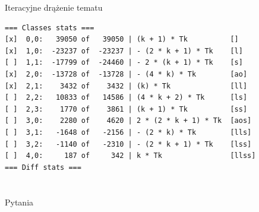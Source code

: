 \documentclass[final]{beamer}
\theoremstyle{bluetheorem}
\theoremstyle{bluetheorem}
\theoremstyle{greentheorem}
\begin{document}
\begin{frame}[fragile]{Iteracyjne drążenie tematu}
    \begin{block}{}
\begin{lstlisting}
=== Classes stats ===
[x]  0,0:   39050 of   39050 | (k + 1) * Tk          []
[x]  1,0:  -23237 of  -23237 | - (2 * k + 1) * Tk    [l]
[ ]  1,1:  -17799 of  -24460 | - 2 * (k + 1) * Tk    [s]
[x]  2,0:  -13728 of  -13728 | - (4 * k) * Tk        [ao]
[x]  2,1:    3432 of    3432 | (k) * Tk              [ll]
[ ]  2,2:   10833 of   14586 | (4 * k + 2) * Tk      [ls]
[ ]  2,3:    1770 of    3861 | (k + 1) * Tk          [ss]
[ ]  3,0:    2280 of    4620 | 2 * (2 * k + 1) * Tk  [aos]
[ ]  3,1:   -1648 of   -2156 | - (2 * k) * Tk        [lls]
[ ]  3,2:   -1140 of   -2310 | - (2 * k + 1) * Tk    [lss]
[ ]  4,0:     187 of     342 | k * Tk                [llss]
=== Diff stats ===
\end{lstlisting}
    \end{block}
\end{frame}


\section*{}

\begin{frame}{Pytania}
\end{frame}
\end{document}
